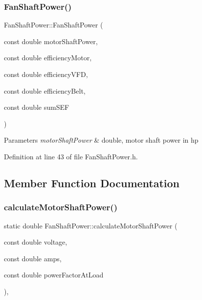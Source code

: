 \subsubsection{\texorpdfstring{Fan\+Shaft\+Power()}{FanShaftPower()}\hspace{0.1cm}{\footnotesize\ttfamily [3/3]}}
{\footnotesize\ttfamily Fan\+Shaft\+Power\+::\+Fan\+Shaft\+Power (\begin{DoxyParamCaption}\item[{const double}]{motor\+Shaft\+Power,  }\item[{const double}]{efficiency\+Motor,  }\item[{const double}]{efficiency\+V\+FD,  }\item[{const double}]{efficiency\+Belt,  }\item[{const double}]{sum\+S\+EF }\end{DoxyParamCaption})\hspace{0.3cm}{\ttfamily [inline]}}


\begin{DoxyParams}{Parameters}
{\em motor\+Shaft\+Power} & double, motor shaft power in hp \\
\hline
\end{DoxyParams}


Definition at line 43 of file Fan\+Shaft\+Power.\+h.



\subsection{Member Function Documentation}
\mbox{\label{class_fan_shaft_power_aa1928514508aed582dc9b11127b4546a}} 
\subsubsection{\texorpdfstring{calculate\+Motor\+Shaft\+Power()}{calculateMotorShaftPower()}\hspace{0.1cm}{\footnotesize\ttfamily [1/3]}}
{\footnotesize\ttfamily static double Fan\+Shaft\+Power\+::calculate\+Motor\+Shaft\+Power (\begin{DoxyParamCaption}\item[{const double}]{voltage,  }\item[{const double}]{amps,  }\item[{const double}]{power\+Factor\+At\+Load }\end{DoxyParamCaption})\hspace{0.3cm}{\ttfamily [inline]}, {\ttfamily [static]}}

